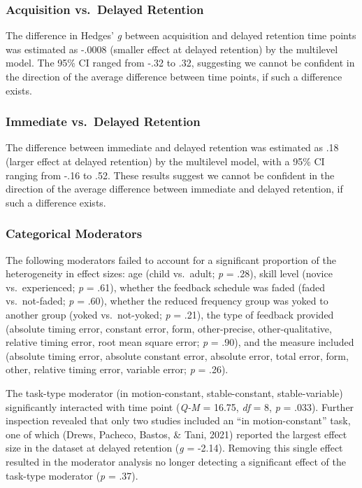 \documentclass[
  english,
  man,mask,floatsintext]{apa7}
\begin{document}
\hypertarget{acquisition-vs.-delayed-retention}{%
\subsubsection{Acquisition vs.~Delayed Retention}\label{acquisition-vs.-delayed-retention}}

The difference in Hedges' \emph{g} between acquisition and delayed retention time points was estimated as -.0008 (smaller effect at delayed retention) by the multilevel model. The 95\% CI ranged from -.32 to .32, suggesting we cannot be confident in the direction of the average difference between time points, if such a difference exists.

\hypertarget{immediate-vs.-delayed-retention}{%
\subsubsection{Immediate vs.~Delayed Retention}\label{immediate-vs.-delayed-retention}}

The difference between immediate and delayed retention was estimated as .18 (larger effect at delayed retention) by the multilevel model, with a 95\% CI ranging from -.16 to .52. These results suggest we cannot be confident in the direction of the average difference between immediate and delayed retention, if such a difference exists.

\hypertarget{categorical-moderators}{%
\subsubsection{Categorical Moderators}\label{categorical-moderators}}

The following moderators failed to account for a significant proportion of the heterogeneity in effect sizes: age (child vs.~adult; \emph{p} = .28), skill level (novice vs.~experienced; \emph{p} = .61), whether the feedback schedule was faded (faded vs.~not-faded; \emph{p} = .60), whether the reduced frequency group was yoked to another group (yoked vs.~not-yoked; \emph{p} = .21), the type of feedback provided (absolute timing error, constant error, form, other-precise, other-qualitative, relative timing error, root mean square error; \emph{p} = .90), and the measure included (absolute timing error, absolute constant error, absolute error, total error, form, other, relative timing error, variable error; \emph{p} = .26).

The task-type moderator (in motion-constant, stable-constant, stable-variable) significantly interacted with time point (\emph{Q-M} = 16.75, \emph{df} = 8, \emph{p} = .033). Further inspection revealed that only two studies included an ``in motion-constant'' task, one of which (Drews, Pacheco, Bastos, \& Tani, 2021) reported the largest effect size in the dataset at delayed retention (\emph{g} = -2.14). Removing this single effect resulted in the moderator analysis no longer detecting a significant effect of the task-type moderator (\emph{p} = .37).
\end{document}

